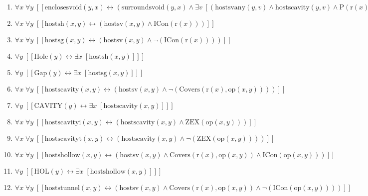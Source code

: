 \documentclass{article}
\begin{document}
\begin{enumerate}
\item $\forall x\; \forall y\;  \left[ \left[ \textrm{enclosesvoid}(y,x) \leftrightarrow \left(\textrm{surroundsvoid}(y,x) \land \exists v\;  \left[ \left(\textrm{hostsvany}(y,v) \land \textrm{hostscavity}(y,v) \land \textrm{P}(\textrm{r}(x),\textrm{r}(y))\right) \right]\right) \right] \right]$
\item $\forall x\; \forall y\;  \left[ \left[ \textrm{hostsh}(x,y) \leftrightarrow \left(\textrm{hostsv}(x,y) \land \textrm{ICon}(\textrm{r}(x))\right) \right] \right]$
\item $\forall x\; \forall y\;  \left[ \left[ \textrm{hostsg}(x,y) \leftrightarrow \left(\textrm{hostsv}(x,y) \land \neg \left(\textrm{ICon}(\textrm{r}(x))\right)\right) \right] \right]$
\item $\forall y\;  \left[ \left[ \textrm{Hole}(y) \leftrightarrow \exists x\;  \left[ \textrm{hostsh}(x,y) \right] \right] \right]$
\item $\forall y\;  \left[ \left[ \textrm{Gap}(y) \leftrightarrow \exists x\;  \left[ \textrm{hostsg}(x,y) \right] \right] \right]$
\item $\forall x\; \forall y\;  \left[ \left[ \textrm{hostscavity}(x,y) \leftrightarrow \left(\textrm{hostsv}(x,y) \land \neg \left(\textrm{Covers}(\textrm{r}(x),\textrm{op}(x,y))\right)\right) \right] \right]$
\item $\forall y\;  \left[ \left[ \textrm{CAVITY}(y) \leftrightarrow \exists x\;  \left[ \textrm{hostscavity}(x,y) \right] \right] \right]$
\item $\forall x\; \forall y\;  \left[ \left[ \textrm{hostscavityi}(x,y) \leftrightarrow \left(\textrm{hostscavity}(x,y) \land \textrm{ZEX}(\textrm{op}(x,y))\right) \right] \right]$
\item $\forall x\; \forall y\;  \left[ \left[ \textrm{hostscavityt}(x,y) \leftrightarrow \left(\textrm{hostscavity}(x,y) \land \neg \left(\textrm{ZEX}(\textrm{op}(x,y))\right)\right) \right] \right]$
\item $\forall x\; \forall y\;  \left[ \left[ \textrm{hostshollow}(x,y) \leftrightarrow \left(\textrm{hostsv}(x,y) \land \textrm{Covers}(\textrm{r}(x),\textrm{op}(x,y)) \land \textrm{ICon}(\textrm{op}(x,y))\right) \right] \right]$
\item $\forall y\;  \left[ \left[ \textrm{HOL}(y) \leftrightarrow \exists x\;  \left[ \textrm{hostshollow}(x,y) \right] \right] \right]$
\item $\forall x\; \forall y\;  \left[ \left[ \textrm{hoststunnel}(x,y) \leftrightarrow \left(\textrm{hostsv}(x,y) \land \textrm{Covers}(\textrm{r}(x),\textrm{op}(x,y)) \land \neg \left(\textrm{ICon}(\textrm{op}(x,y))\right)\right) \right] \right]$

\end{enumerate}
\end{document}
